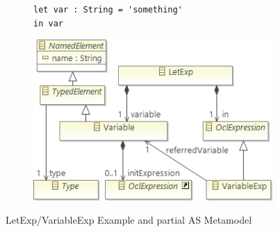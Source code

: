 \documentclass{llncs}
\begin{document}
\begin{figure}[htbp]
\centering
\begin{subfigure}{0.45\textwidth}
  \centering
  \begin{lstlisting}[label=lst:letExpExample, language=OCL]
let var : String = 'something'
in var
  \end{lstlisting} 
\end{subfigure}%
\begin{subfigure}{0.55\textwidth}
  \centering
  \includegraphics[scale=0.5]{images/LetExpAS.png}
\end{subfigure}
\caption{LetExp/VariableExp Example and partial AS Metamodel}
\label{fig:LetExpAS}
\end{figure}

\end{document}
